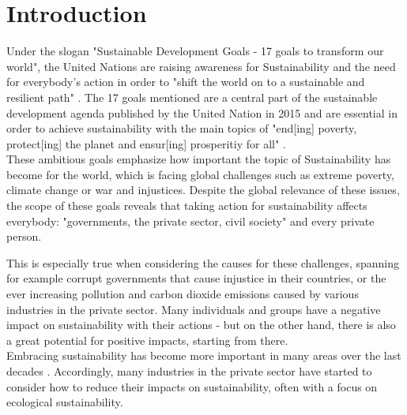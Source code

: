 \chapter{Introduction}
Under the slogan "Sustainable Development Goals - 17 goals to transform our world"\cite{nino_sustainable_2017}, the United Nations are raising awareness for Sustainability and the need for everybody's action in order to "shift the world on to a sustainable and resilient path" \cite{UN_transform_15}%
. The 17 goals mentioned are a central part of the sustainable development agenda published by the United Nation in 2015 \cite{UN_transform_15}%
 and are essential in order to achieve sustainability with the main topics of "end[ing] poverty, protect[ing] the planet and ensur[ing] prosperitiy for all" \cite{nino_sustainable_2017}.\\
These ambitious goals emphasize how important the topic of Sustainability has become for the world, which is facing global challenges such as extreme poverty, climate change or war and injustices. Despite the global relevance of these issues, the scope of these goals reveals that taking action for sustainability affects everybody: "governments, the private sector, civil society"\cite{nino_sustainable_2017} and every private person. 

This is especially true when considering the causes for these challenges, spanning for example corrupt governments that cause injustice in their countries, or the ever increasing pollution and carbon dioxide emissions caused by various industries in the private sector. Many individuals and groups %
 have a negative impact on sustainability with their actions - but on the other hand, there is also a great potential for positive impacts, starting from there.\\
 Embracing sustainability has become more important in many areas over the last decades %
. Accordingly, many industries in the private sector have started to consider how to reduce their impacts on sustainability, often with a focus on ecological sustainability. %

